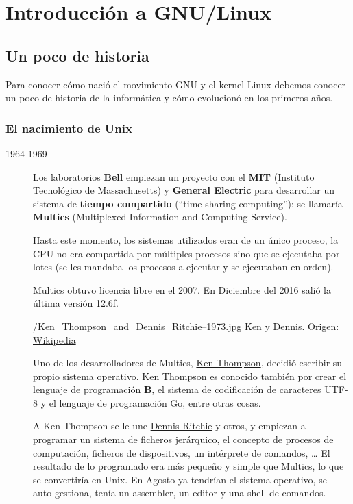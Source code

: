 \chapter{Introducción a GNU/Linux}
\section{Un poco de historia}
Para conocer cómo nació el movimiento GNU y el kernel Linux debemos conocer un poco de historia de la informática y cómo evolucionó en los primeros años.

\subsection{El nacimiento de Unix}

\begin{description}
\item[1964-1969]Los laboratorios \textbf{Bell} empiezan un proyecto con el \textbf{MIT} (Instituto Tecnológico de Massachusetts) y \textbf{General Electric} para desarrollar un sistema de \textbf{tiempo compartido} (“time-sharing computing”): se llamaría \textbf{Multics} (Multiplexed Information and Computing Service).

Hasta este momento, los sistemas utilizados eran de un único proceso, la CPU no era compartida por múltiples procesos sino que se ejecutaba por lotes (se les mandaba los procesos a ejecutar y se ejecutaban en orden).

Multics obtuvo licencia libre en el 2007. En Diciembre del 2016 salió la última versión 12.6f.

  {/Ken_Thompson_and_Dennis_Ritchie--1973.jpg}
  {\href{https://en.wikipedia.org/wiki/Ken_Thompson}{Ken y Dennis. Origen: Wikipedia}}
  {
  Uno de los desarrolladores de Multics, \href{https://en.wikipedia.org/wiki/Ken_Thompson}{Ken Thompson}, decidió escribir su propio sistema operativo. Ken Thompson es conocido también por crear el lenguaje de programación \textbf{B}, el sistema de codificación de caracteres UTF-8 y el lenguaje de programación Go, entre otras cosas.

A Ken Thompson se le une \href{https://en.wikipedia.org/wiki/Dennis_Ritchie}{Dennis Ritchie} y otros, y empiezan a programar un sistema de ficheros jerárquico, el concepto de procesos de computación, ficheros de dispositivos, un intérprete de comandos, … El resultado de lo programado era más pequeño y simple que Multics, lo que se convertiría en Unix. En Agosto ya tendrían el sistema operativo, se auto-gestiona,  tenía un assembler, un editor y una shell de comandos.

}
\end{description}
